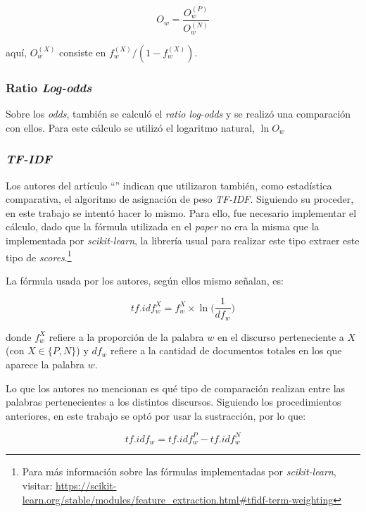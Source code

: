 \begin{equation*}
    O_w = \frac{O_{w}^{(P)}}{O_{w}^{(N)}}
\end{equation*}

aquí, $O_{w}^{(X)}$ consiste en $f_{w}^{(X)}/(1-f_{w}^{(X)})$.

\subsubsection{Ratio \textit{Log-odds}}
Sobre los \textit{odds}, también se calculó el \textit{ratio log-odds} y
se realizó una comparación con ellos. Para este cálculo se utilizó el
logaritmo natural, $\ln{O_w}$

\subsubsection{\textit{TF-IDF}}
Los autores del artículo ``'' indican
que utilizaron también, como estadística comparativa, el algoritmo de asignación
de peso \textit{TF-IDF}. Siguiendo su proceder, en este trabajo se intentó
hacer lo mismo. Para ello, fue necesario implementar el cálculo, dado que
la fórmula utilizada en el \textit{paper} no era la misma que la implementada
por \textit{scikit-learn}, la librería usual para realizar este tipo extraer
este tipo de \textit{scores}.\footnote{Para más información sobre las fórmulas
implementadas por \textit{scikit-learn}, visitar:
\url{https://scikit-learn.org/stable/modules/feature_extraction.html\#tfidf-term-weighting}}\par
La fórmula usada por los autores, según ellos mismo señalan, es:

\begin{equation*}
    tf.idf_{w}^{X} = f_{w}^{X} \times \ln\bigg({\frac{1}{df_{w}}}\bigg)
\end{equation*}

donde $f_{w}^{X}$ refiere a la proporción de la palabra $w$ en el discurso
perteneciente a $X$ (con $X \in \lbrace P,N \rbrace$) y $df_w$ refiere a la
cantidad de documentos totales en los que aparece la palabra $w$.\par
Lo que los autores no mencionan es qué tipo de comparación realizan entre las
palabras pertenecientes a los distintos discursos. Siguiendo los procedimientos
anteriores, en este trabajo se optó por usar la sustracción, por lo que:

\begin{equation*}
    tf.idf_{w} = tf.idf_{w}^{P}-tf.idf_{w}^{N}
\end{equation*}

